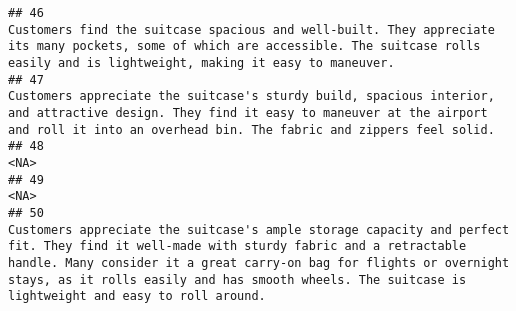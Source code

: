 \documentclass[
]{article}
\begin{document}
\begin{verbatim}
## 46                                                                                                                                                                                                                                                                                                                                                                                                                             Customers find the suitcase spacious and well-built. They appreciate its many pockets, some of which are accessible. The suitcase rolls easily and is lightweight, making it easy to maneuver.
## 47                                                                                                                                                                                                                                                                                                                                                                                                              Customers appreciate the suitcase's sturdy build, spacious interior, and attractive design. They find it easy to maneuver at the airport and roll it into an overhead bin. The fabric and zippers feel solid.
## 48                                                                                                                                                                                                                                                                                                                                                                                                                                                                                                                                                                                                                       <NA>
## 49                                                                                                                                                                                                                                                                                                                                                                                                                                                                                                                                                                                                                       <NA>
## 50                                                                                                                                                                                                                                                                                                       Customers appreciate the suitcase's ample storage capacity and perfect fit. They find it well-made with sturdy fabric and a retractable handle. Many consider it a great carry-on bag for flights or overnight stays, as it rolls easily and has smooth wheels. The suitcase is lightweight and easy to roll around.

\end{verbatim}
\end{document}
